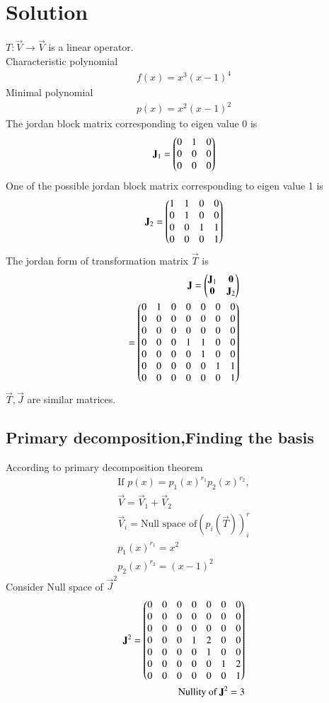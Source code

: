 \documentclass[journal,12pt,twocolumn]{IEEEtran}
\begin{document}
\section{Solution}
$T:\vec{V}\rightarrow \vec{V}$ is a linear operator.\\
Characteristic polynomial
\begin{align}
    f(x)=x^3(x-1)^4
\end{align}
Minimal polynomial
\begin{align}
    p(x)=x^2(x-1)^2
\end{align}
The jordan block matrix corresponding to eigen value 0 is
\begin{align}
    \mathbf{J}_1=\begin{pmatrix}0&1&0\\0&0&0\\0&0&0\end{pmatrix}
\end{align}
One of the possible jordan block matrix corresponding to eigen value 1 is
\begin{align}
   \mathbf{J}_2=\begin{pmatrix}1&1&0&0\\0&1&0&0\\0&0&1&1\\0&0&0&1\end{pmatrix}  
\end{align}
The jordan form of transformation matrix $\vec{T}$ is
\begin{align}
    \mathbf{J}=\begin{pmatrix}\mathbf{J}_1&\mathbf{0}\\\mathbf{0}&\mathbf{J}_2\end{pmatrix}\\
    =\begin{pmatrix}0&1&0&0&0&0&0\\0&0&0&0&0&0&0\\0&0&0&0&0&0&0\\0&0&0&1&1&0&0\\0&0&0&0&1&0&0\\0&0&0&0&0&1&1\\0&0&0&0&0&0&1\end{pmatrix}
    \end{align}
     $\vec{T},\vec{J}$ are similar matrices.
    \subsection{Primary decomposition,Finding the basis}
  According to primary decomposition theorem 
  \begin{align}
  \text{If }p(x)={p_{1} (x)}^{r_{1}}{p_{2} (x)}^{r_{2}},\\
      \vec{V}=\vec{V}_1+\vec{V}_2\\
      \vec{V}_i=\text{Null space of} (p_i(\vec{T}))^r_i\\
      {p_{1} (x)}^{r_{1}}=x^2\\
      {p_{2} (x)}^{r_{2}}=(x-1)^2
  \end{align}
Consider Null space of $\vec{J}^2$
\begin{align}
   \mathbf{J}^2=\begin{pmatrix}0&0&0&0&0&0&0\\0&0&0&0&0&0&0\\0&0&0&0&0&0&0\\0&0&0&1&2&0&0\\0&0&0&0&1&0&0\\0&0&0&0&0&1&2\\0&0&0&0&0&0&1\end{pmatrix}\label{1}\\
   \text{Nullity of } \mathbf{J}^2=3
\end{align}
\end{document}
